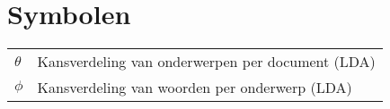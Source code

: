 \documentclass[master=cws,masteroption=ai]{kulemt}
\begin{document}
\section*{Symbolen}
\begin{flushleft}
  \renewcommand{\arraystretch}{1.1}
  \begin{tabularx}{\textwidth}{@{}p{12mm}X@{}}
    $\theta$   & Kansverdeling van onderwerpen per document (LDA) \\
    $\phi$   & Kansverdeling van woorden per onderwerp (LDA)  \\
  \end{tabularx}
\end{flushleft}

\mainmatter








\appendixpage*          %
\appendix



\backmatter


\end{document}

